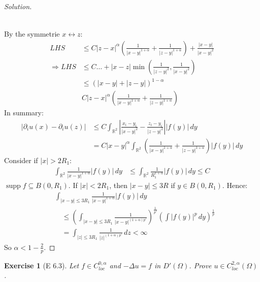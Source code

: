 \documentclass{report}
\theoremstyle{tommy}
\newtheorem{ex}[defn]{Exercise}
\newcommand{\supp}{\operatorname{supp}}
\begin{document}
\begin{proof}[Solution]
\begin{enumerate}
\begin{align*}
      \end{align*}
    \end{enumerate}
    By the symmetrie \(x \leftrightarrow z\):
    \begin{align*}
      LHS &\le C|z-x|^\alpha \left(\frac{1}{|x-y|^{1 + \alpha}} + \frac{1}{|z-y|^{1+\alpha}}\right) + \frac{|x-y|}{|x-y|^2} \\
      \Rightarrow LHS &\le C \dots + |x-z| \min\left(\frac{1}{|z-y|^2}, \frac{1}{|x-y|^2}\right) \\
      & \le (|x-y| + |z-y|)^{1-\alpha} \\
      & C |z-x|^\alpha \left(\frac{1}{|x-y|^{1+\alpha}} + \frac{1}{|z-y|^{1+\alpha}}\right)
    \end{align*}
    In summary:
    \begin{align*}
      |\partial_i u(x) - \partial_i u(z)| 
      &\le C \int_{\mathbb{R}^2} \left| \frac{x_i - y_i}{|x-y|^2} - \frac{z_i - y_i}{|z-y|^2}\right||f(y)| \, dy \\
      &= C |x-y|^\alpha \int_{\mathbb{R}^2} \left(\frac{1}{|x-y|^{1+\alpha}} + \frac{1}{|z-y|^{1+\alpha}}\right) |f(y)| \, dy
    \end{align*}
    Consider if \(|x| > 2 R_1\):
    \begin{align*}
      \int_{\mathbb{R}^2} \frac{1}{|x-y|^{1+\alpha}} |f(y)| \, dy 
      &\le \int_{\mathbb{R}^2} \frac{1}{R_1^{1+\alpha}} |f(y)| \, dy \le C
    \end{align*}
    \(\supp f \subseteq B(0, R_1)\). If \(|x| < 2 R_1\), then \(|x-y| \le 3R\) if \(y \in B(0, R_1)\). Hence:
    \begin{align*}
      &\int_{|x-y| \le 3 R_1} \frac{1}{|x-y|^{1+\alpha}} |f(y)| \, dy \\
      &\quad \le \left(\int_{|x-y| \le 3 R_1} \frac{1}{|x-y|^{(1+\alpha)p'}}\right)^{\frac{1}{p'}} \left(\int |f(y)|^p \, dy\right)^{\frac{1}{p}} \\
      &\quad= \int_{|z| \le 3 R_1} \frac{1}{|z|^{(1+\alpha)p'}} \,dz < \infty
    \end{align*}
    So \(\alpha < 1 - \frac{2}{p}\).
  \end{proof}

  \begin{ex}[E 6.3]  
    Let \(f \in C_{loc}^{0,\alpha}\) and \(- \Delta u = f\) in \(D'(\Omega)\). Prove \(u \in C_{loc}^{2, \alpha}(\Omega)\).
  \end{ex}
\end{document}

